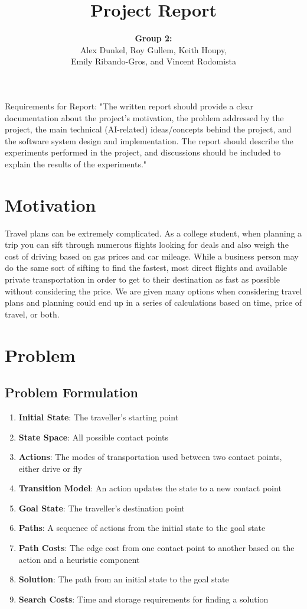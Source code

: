\documentclass[11pt]{article}
\title{Project Report}
\author{ {\bf Group 2:} \\
Alex Dunkel,
Roy Gullem,
Keith Houpy, \\
Emily Ribando-Gros, and
Vincent Rodomista}
\begin{document}
\maketitle

Requirements for Report:
"The written report should provide a clear documentation about the project's motivation, the problem addressed by the project, the main technical (AI-related) ideas/concepts behind the project, and the software system design and implementation. 
The report should describe the experiments performed in the project, and discussions should be included to explain the results of the experiments."

\section{Motivation}

Travel plans can be extremely complicated. As a college student, when planning a trip you can sift through numerous flights looking for deals and also weigh the cost of driving based on gas prices and car mileage. While a business person may do the same sort of sifting to find the fastest, most direct flights and available private transportation in order to get to their destination as fast as possible without considering the price. We are given many options when considering travel plans and planning could end up in a series of calculations based on time, price of travel, or both. 

\section{Problem}

\subsection{Problem Formulation}
\begin{enumerate}
\item \textbf{Initial State}: The traveller's starting point
\item \textbf{State Space}: All possible contact points
\item	 \textbf{Actions}: The modes of transportation used between two contact points, either drive or fly
\item \textbf{Transition Model}: An action updates the state to a new contact point
\item \textbf{Goal State}: The traveller's destination point
\item \textbf{Paths}: A sequence of actions from the initial state to the goal state
\item \textbf{Path Costs}: The edge cost from one contact point to another based on the action and a heuristic component
\item \textbf{Solution}: The path from an initial state to the goal state
\item \textbf{Search Costs}: Time and storage requirements for finding a solution
\end{enumerate}
\end{document}
